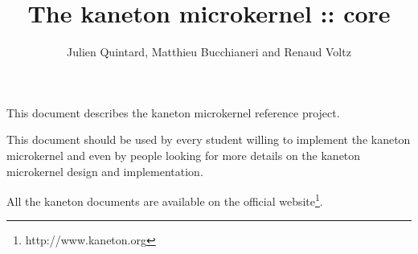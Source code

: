 %
%
%
%
%
%

%
%

\def\path{../..}

%
%



%
%

\rhead{}

%
%

\title{The kaneton microkernel :: core
       \logos}

%
%

\author{\small{Julien Quintard},
        \small{Matthieu Bucchianeri} and
        \small{Renaud Voltz}}

%
%



%
%

\maketitle

%
%

This document describes the kaneton microkernel reference project.

\-

This document should be used by every student willing to implement the
kaneton microkernel and even by people looking for more details on
the kaneton microkernel design and implementation.

\-

All the kaneton documents are available on
  the official website\footnote{http://www.kaneton.org}.

%
%

\toc

%
%















